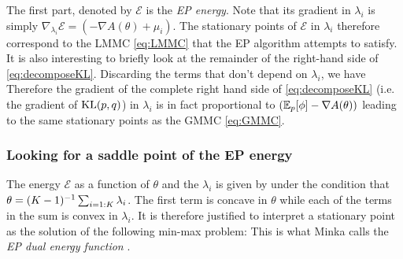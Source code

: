%
%
The first part, denoted by $\mathcal E$ is the \emph{EP energy}. Note that its gradient in $\lambda_i$ is simply $\nabla_{\lambda_i}\mathcal E = (-\nabla A(\theta) + \mu_{i})$. 
The stationary points of $\mathcal E$ in $\lambda_i$ therefore correspond to the LMMC \eqref{eq:LMMC} that the EP algorithm attempts to satisfy.
It is also interesting to briefly look at the remainder of the right-hand side of \eqref{eq:decomposeKL}. Discarding the terms that don't depend on $\lambda_i$, we have
%
%
Therefore the gradient of the complete right hand side of \eqref{eq:decomposeKL} (i.e. the gradient of $\mathrm{KL}\!\left(p,q\right)$) in $\lambda_i$ is in fact proportional to $(\mathbb E_{p}[\phi]-\nabla A(\theta))$ leading to the same stationary points as the GMMC \eqref{eq:GMMC}.
%
\subsubsection*{Looking for a saddle point of the EP energy}

The energy $\mathcal E$ as a function of $\theta$ and the $\lambda_i$ is given by
under the condition that $\theta=(K-1)^{-1} \sum_{i=1:K}\lambda_i$. The first term is concave in $\theta$ while each of the terms in the sum is convex in $\lambda_i$. It is therefore justified to interpret a stationary point as the solution of the following min-max problem:
This is what Minka calls the \emph{EP dual energy function} \citep{minka01c}.

